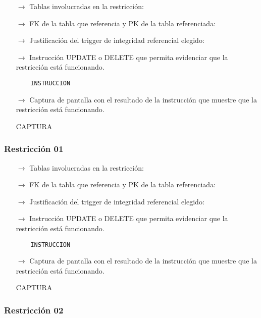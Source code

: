 \begin{itemize}
    \item[$\rightarrow$] Tablas involucradas en la restricción: 
    \item[$\rightarrow$] FK de la tabla que referencia y PK de la tabla referenciada: 
    \item[$\rightarrow$] Justificación del trigger de integridad referencial elegido: 
    \item[$\rightarrow$] Instrucción UPDATE o DELETE que permita evidenciar que la restricción está
    funcionando.
    \begin{verbatim}
    INSTRUCCION
    \end{verbatim}
    \item[$\rightarrow$] Captura de pantalla con el resultado de la instrucción que muestre que la restricción está
    funcionando.
    \begin{center}
        CAPTURA
    \end{center}
\end{itemize}

\subsubsection*{Restricción 01}

\begin{itemize}
    \item[$\rightarrow$] Tablas involucradas en la restricción: 
    \item[$\rightarrow$] FK de la tabla que referencia y PK de la tabla referenciada: 
    \item[$\rightarrow$] Justificación del trigger de integridad referencial elegido: 
    \item[$\rightarrow$] Instrucción UPDATE o DELETE que permita evidenciar que la restricción está
    funcionando.
    \begin{verbatim}
    INSTRUCCION
    \end{verbatim}
    \item[$\rightarrow$] Captura de pantalla con el resultado de la instrucción que muestre que la restricción está
    funcionando.
    \begin{center}
        CAPTURA
    \end{center}
\end{itemize}

\subsubsection*{Restricción 02}

